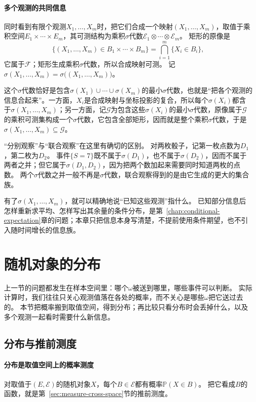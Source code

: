 \paragraph{多个观测的共同信息}
同时看到有限个观测$X_1,\dots,X_m$时，把它们合成一个映射$(X_1,\dots,X_m)$，取值于乘积空间$E_1\times\cdots\times E_m$，其可测结构为乘积$\sigma$代数$\mathcal E_1\otimes\cdots\otimes\mathcal E_m$。
矩形的原像是
\[
  \{(X_1,\dots,X_m)\in B_1\times\cdots\times B_m\}=\bigcap_{i=1}^m\{X_i\in B_i\},
\]
它属于$\mathcal F$；矩形生成乘积$\sigma$代数，所以合成映射可测。
记$\sigma(X_1,\dots,X_m)=\sigma\bigl((X_1,\dots,X_m)\bigr)$。

这个$\sigma$代数恰好是包含$\sigma(X_1)\cup\cdots\cup\sigma(X_m)$的最小$\sigma$代数，也就是“把各个观测的信息合起来”。一方面，$X_i$是合成映射与坐标投影的复合，所以每个$\sigma(X_i)$都含于$\sigma(X_1,\dots,X_m)$；另一方面，记$\mathcal G$为包含这些$\sigma(X_i)$的最小$\sigma$代数，原像属于$\mathcal G$的乘积可测集构成一个$\sigma$代数，它包含全部矩形，因而就是整个乘积$\sigma$代数，于是$\sigma(X_1,\dots,X_m)\subseteq\mathcal G$。

“分别观察”与“联合观察”在这里有确切的区别。
对两枚骰子，记第一枚点数为$D_1$，第二枚为$D_2$。
事件$\{S=7\}$既不属于$\sigma(D_1)$，也不属于$\sigma(D_2)$，因而不属于两者之并；但它属于$\sigma(D_1,D_2)$，因为把两个数加起来需要同时知道两枚的点数。
两个$\sigma$代数之并一般不再是$\sigma$代数，联合观察得到的是由它生成的更大的集合族。

有了$\sigma(X_1,\dots,X_m)$，就可以精确地说“已知这些观测”指什么。
已知部分信息后怎样重新求平均、怎样写出其余量的条件分布，是第~\ref{chap:conditional-expectation}章的问题；本章只把信息本身写清楚，不提前使用条件期望，也不引入随时间增长的信息族。

\section{随机对象的分布}
\label{sec:pmod-distributions}

上一节的问题都发生在样本空间里：哪个$\omega$被送到哪里，哪些事件可以判断。
实际计算时，我们往往只关心观测值落在各处的概率，而不关心是哪些$\omega$把它送过去的。
本节把概率搬到取值空间，得到分布；再比较只看分布时会丢掉什么，以及多个观测一起看时需要什么新信息。

\subsection{分布与推前测度}

\paragraph{分布是取值空间上的概率测度}
对取值于$(E,\mathcal E)$的随机对象$X$，每个$B\in\mathcal E$都有概率$\mathbb P(X\in B)$。
把它看成$B$的函数，就是第~\ref{sec:measure-cross-space}节的推前测度。


